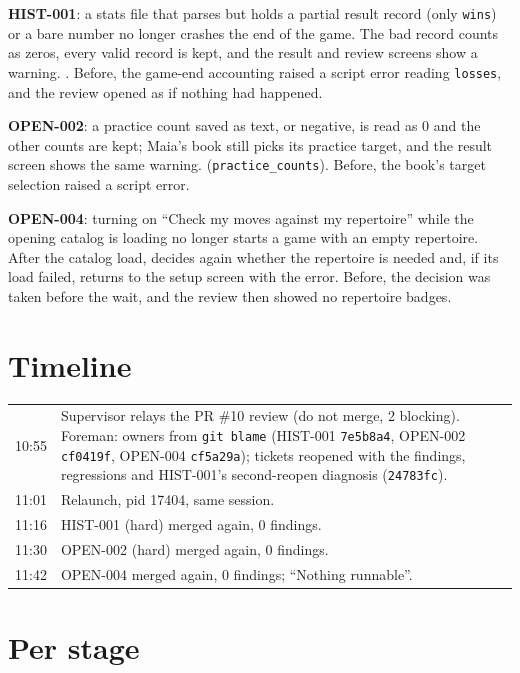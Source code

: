 \documentclass[11pt,a4paper]{article}
\begin{document}
\textbf{HIST-001}: a stats file that parses but holds a partial result record (only
\texttt{wins}) or a bare number no longer crashes the end of the game. The bad record counts as
zeros, every valid record is kept, and the result and review screens show a warning.
. Before, the game-end accounting raised a script error reading
\texttt{losses}, and the review opened as if nothing had happened.

\textbf{OPEN-002}: a practice count saved as text, or negative, is read as 0 and the other
counts are kept; Maia's book still picks its practice target, and the result screen shows the
same warning.  (\texttt{practice\_counts}). Before, the book's target
selection raised a script error.

\textbf{OPEN-004}: turning on ``Check my moves against my repertoire'' while the opening catalog
is loading no longer starts a game with an empty repertoire. After the catalog load,
 decides again whether the repertoire is needed and, if its load failed,
returns to the setup screen with the error. Before, the decision was taken before the wait, and
the review then showed no repertoire badges.

\section*{Timeline}

\begin{tabularx}{\linewidth}{@{}lX@{}}
\toprule
10:55 & Supervisor relays the PR \#10 review (do not merge, 2 blocking). Foreman: owners from \texttt{git blame} (HIST-001 \texttt{7e5b8a4}, OPEN-002 \texttt{cf0419f}, OPEN-004 \texttt{cf5a29a}); tickets reopened with the findings, regressions and HIST-001's second-reopen diagnosis (\texttt{24783fc}). \\
11:01 & Relaunch, pid 17404, same session. \\
11:16 & HIST-001 (hard) merged again, 0 findings. \\
11:30 & OPEN-002 (hard) merged again, 0 findings. \\
11:42 & OPEN-004 merged again, 0 findings; ``Nothing runnable''. \\
\bottomrule
\end{tabularx}

\section*{Per stage}
\end{document}
